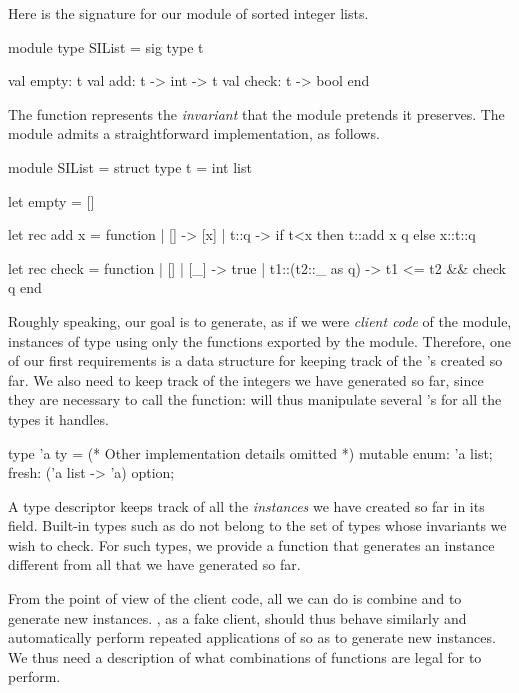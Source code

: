 Here is the signature for our module of sorted integer lists.
%
\begin{ocamlcode}
module type SIList = sig
  type t

  val empty: t
  val add: t -> int -> t
  val check: t -> bool
end
\end{ocamlcode}
%
The  function represents the \emph{invariant} that the module
pretends it preserves. The module admits a straightforward implementation, as
follows.
%
\begin{ocamlcode}
module SIList = struct
  type t = int list

  let empty = []

  let rec add x = function
    | [] -> [x]
    | t::q -> if t<x then t::add x q else x::t::q

  let rec check = function
    | [] | [_] -> true
    | t1::(t2::_ as q) -> t1 <= t2 && check q
end
\end{ocamlcode}
%
Roughly speaking, our goal is to generate, as if we were \emph{client code} of
the module, instances of type  using only the functions exported by the
module. Therefore, one of our first requirements is a data structure for keeping
track of the 's created so far. We also need to keep track of the
integers we have generated so far, since they are necessary to call the
 function: \arti will thus manipulate several 's for all the
types it handles.
%
\begin{ocamlcode}
type 'a ty = {
  (* Other implementation details omitted *)
  mutable enum: 'a list;
  fresh: ('a list -> 'a) option;
}
\end{ocamlcode}
%
A type descriptor  keeps track of all the \emph{instances} we have
created so far in its  field. Built-in types such as 
do not belong to the set of types whose invariants we wish to check. For such
types, we provide a  function that generates an instance different
from all that we have generated so far.

From the point of view of the client code, all we can do is combine
 and  to generate new instances. \arti, as a fake client,
should thus behave similarly and automatically perform repeated applications of
 so as to generate new instances. We thus need a description of what
combinations of functions are legal for \arti to perform.

